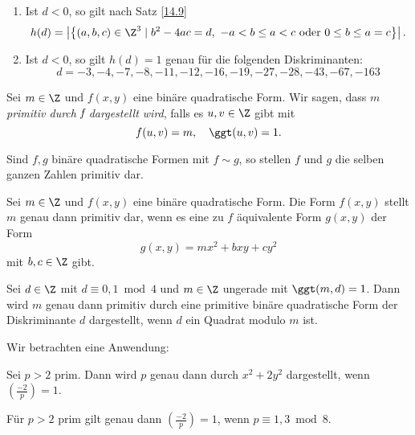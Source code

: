 \begin{rem*}
	\begin{enumerate}[label={\roman*})]
		\item Ist $d<0$, so gilt nach Satz \ref{14.9}
			\[ h(d) = \left| \left\{ (a,b,c) \in \Z^3 \mid b^2-4ac=d,\ -a < b \leq a < c \ \text{oder } 0 \leq b \leq a = c \right\} \right|. \]
		\item Ist $d<0$, so gilt $h(d)=1$ genau für die folgenden Diskriminanten:\\
			\[ d=-3, -4, -7, -8, -11, -12, -16, -19, -27, -28, -43, -67, -163 \]
	\end{enumerate}
\end{rem*}

\begin{defn*}
	Sei $m \in \Z$ und $f(x,y)$ eine binäre quadratische Form. Wir sagen, dass $m$ \emph{primitiv durch $\emph{f}$ dargestellt wird}, falls es $u,v \in \Z$ gibt mit
	\[ f(u,v) = m,\quad \ggt(u,v)=1. \]
\end{defn*}

\begin{rem*}
	Sind $f,g$ binäre quadratische Formen mit $f\sim g$, so stellen $f$ und $g$ die selben ganzen Zahlen primitiv dar.
\end{rem*}

\begin{lem}\autolabel
	Sei $m \in \Z$ und $f(x,y)$ eine binäre quadratische Form. Die Form $f(x,y)$ stellt $m$ genau dann primitiv dar, wenn es eine zu $f$ äquivalente Form $g(x,y)$ der Form
	\[ g(x,y) = mx^2 + bxy + cy^2 \]
	mit $b,c \in \Z$ gibt.
\end{lem}

\begin{lem}\autolabel
	Sei $d \in \Z$ mit $d \equiv 0,1 \bmod 4$ und $m \in \Z$ ungerade mit $\ggt(m,d)=1$. Dann wird $m$ genau dann primitiv durch eine primitive binäre quadratische Form der Diskriminante $d$ dargestellt, wenn $d$ ein Quadrat modulo $m$ ist.
\end{lem}

Wir betrachten eine Anwendung:

\begin{thm}\autolabel
	Sei $p>2$ prim. Dann wird $p$ genau dann durch $x^2+2y^2$ dargestellt, wenn $\left( \frac{-2}{p} \right) = 1$.
\end{thm}

\begin{rem*}
	Für $p>2$ prim gilt genau dann \( \left(\frac{-2}{p}\right) = 1 \), wenn $p \equiv 1,3 \bmod 8$.
\end{rem*}
